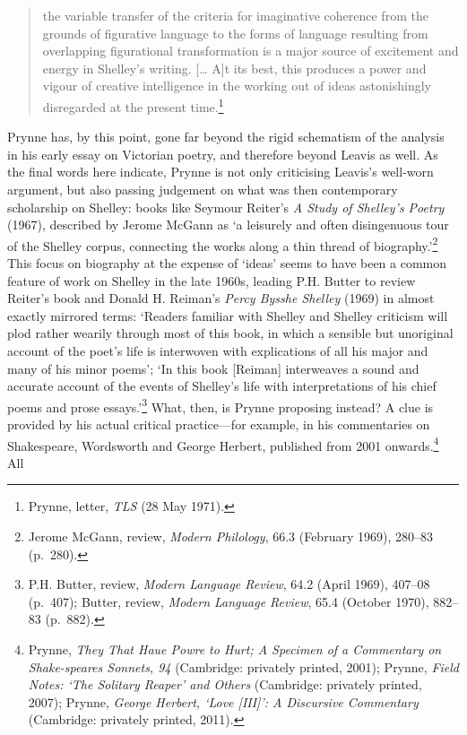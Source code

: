 \documentclass[]{article}
\begin{document}
\begin{quote}
\singlespacing the variable transfer of the criteria for imaginative
coherence from the grounds of figurative language to the forms of
language resulting from overlapping figurational transformation is a
major source of excitement and energy in Shelley’s writing. {[}\ldots{}
A{]}t its best, this produces a power and vigour of creative
intelligence in the working out of ideas astonishingly disregarded at
the present time.\footnote{Prynne, letter, \emph{TLS} (28 May 1971).}
\end{quote}

\noindent Prynne has, by this point, gone far beyond the rigid
schematism of the analysis in his early essay on Victorian poetry, and
therefore beyond Leavis as well. As the final words here indicate,
Prynne is not only criticising Leavis’s well-worn argument, but also
passing judgement on what was then contemporary scholarship on Shelley:
books like Seymour Reiter’s \emph{A Study of Shelley’s Poetry} (1967),
described by Jerome McGann as ‘a leisurely and often disingenuous tour
of the Shelley corpus, connecting the works along a thin thread of
biography.’\footnote{Jerome McGann, review, \emph{Modern Philology},
  66.3 (February 1969), 280–83 (p.~280).} This focus on biography at the
expense of ‘ideas’ seems to have been a common feature of work on
Shelley in the late 1960s, leading P.H. Butter to review Reiter’s book
and Donald H. Reiman’s \emph{Percy Bysshe Shelley} (1969) in almost
exactly mirrored terms: ‘Readers familiar with Shelley and Shelley
criticism will plod rather wearily through most of this book, in which a
sensible but unoriginal account of the poet’s life is interwoven with
explications of all his major and many of his minor poems’; ‘In this
book {[}Reiman{]} interweaves a sound and accurate account of the events
of Shelley’s life with interpretations of his chief poems and prose
essays.’\footnote{P.H. Butter, review, \emph{Modern Language Review},
  64.2 (April 1969), 407–08 (p.~407); Butter, review, \emph{Modern
  Language Review}, 65.4 (October 1970), 882–83 (p.~882).} What, then,
is Prynne proposing instead? A clue is provided by his actual critical
practice—for example, in his commentaries on Shakespeare, Wordsworth and
George Herbert, published from 2001 onwards.\footnote{Prynne, \emph{They
  That Haue Powre to Hurt; A Specimen of a Commentary on Shake-speares
  Sonnets, 94} (Cambridge: privately printed, 2001); Prynne, \emph{Field
  Notes: ‘The Solitary Reaper’ and Others} (Cambridge: privately
  printed, 2007); Prynne, \emph{George Herbert, ‘Love {[}III{]}’: A
  Discursive Commentary} (Cambridge: privately printed, 2011).} All
\end{document}
